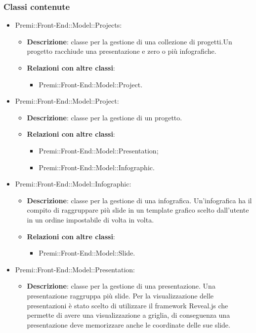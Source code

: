 	\subsubsection*{Classi contenute}
		\begin{itemize}
		 \item Premi::Front-End::Model::Projects:
			\begin{itemize}
				\item \textbf{Descrizione}: classe per la gestione di una collezione di progetti.Un progetto racchiude una presentazione e zero o più infografiche.
				\item \textbf{Relazioni con altre classi}:
				\begin{itemize}
					\item Premi::Front-End::Model::Project.
				\end{itemize}
			\end{itemize}
		\item  Premi::Front-End::Model::Project: 
			 \begin{itemize}
				\item \textbf{Descrizione}: classe per la gestione di un progetto.
				\item \textbf{Relazioni con altre classi}:
				\begin{itemize}
					\item Premi::Front-End::Model::Presentation;
					\item Premi::Front-End::Model::Infographic.
				\end{itemize}
			\end{itemize}
		 \item  Premi::Front-End::Model::Infographic:
			\begin{itemize}
				\item \textbf{Descrizione}: classe per la gestione di una \gls{infografica}. Un'\gls{infografica} ha il compito di raggruppare più \gls{slide} in un \gls{template} grafico scelto dall'utente in un ordine impostabile di volta in volta.
				\item \textbf{Relazioni con altre classi}:
				\begin{itemize}
					\item Premi::Front-End::Model::Slide.
				\end{itemize}
			\end{itemize}
		 \item   Premi::Front-End::Model::Presentation:
			\begin{itemize}
				\item \textbf{Descrizione}: classe per la gestione di una presentazione. Una presentazione raggruppa più \gls{slide}. Per la visualizzazione delle presentazioni è stato scelto di utilizzare il \gls{framework} \gls{Reveal.js} che permette di avere una visualizzazione a griglia, di conseguenza una presentazione deve memorizzare anche le coordinate delle sue \gls{slide}.

\end{itemize}
\end{itemize}
